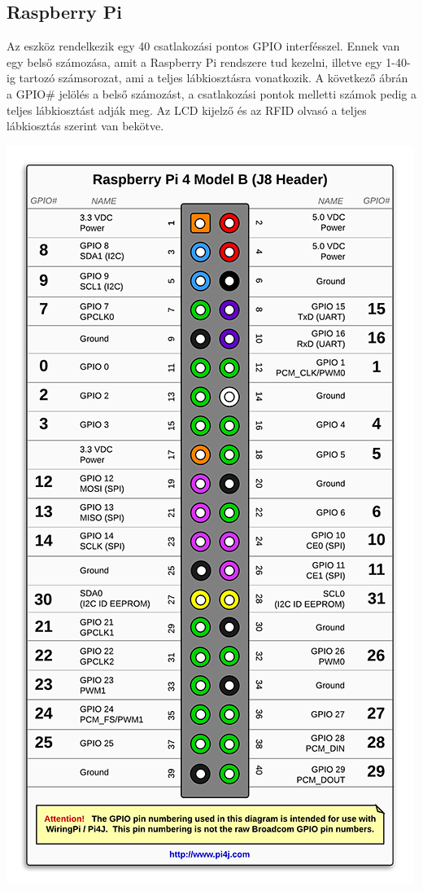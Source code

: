 \documentclass[11pt, a4paper]{article}
\begin{document}
		\subsection{Raspberry Pi}
		\begin{flushleft}
			\justifying
			Az eszköz rendelkezik egy 40 csatlakozási pontos GPIO interfésszel. Ennek van egy belső számozása, amit a Raspberry Pi rendszere tud kezelni, illetve egy 1-40-ig tartozó számsorozat, ami a teljes lábkiosztásra vonatkozik. A következő ábrán a GPIO\# jelölés a belső számozást, a csatlakozási pontok melletti számok pedig a teljes lábkiosztást adják meg. Az LCD kijelző és az RFID olvasó a teljes lábkiosztás szerint van bekötve.
		\end{flushleft}
			\begin{minipage}{\linewidth}
				\centering
				\includegraphics[width=0.7\linewidth]{img/rpi_pinout}
				\label{fig:2rpipinout}
			\end{minipage}
			
\end{document}
